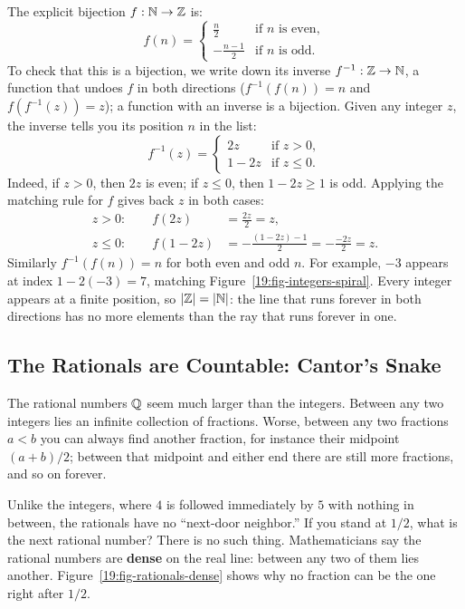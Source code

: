 The explicit bijection $f: \mathbb{N} \to \mathbb{Z}$ is:
\[
f(n) = \begin{cases} \frac{n}{2} & \text{if } n \text{ is even}, \\ -\frac{n-1}{2} & \text{if } n \text{ is odd}. \end{cases}
\]
To check that this is a bijection, we write down its inverse $f^{-1}: \mathbb{Z} \to \mathbb{N}$, a function that undoes $f$ in both directions ($f^{-1}(f(n)) = n$ and $f(f^{-1}(z)) = z$); a function with an inverse is a bijection. Given any integer $z$, the inverse tells you its position $n$ in the list:
\[
f^{-1}(z) = \begin{cases} 2z & \text{if } z > 0, \\ 1 - 2z & \text{if } z \le 0. \end{cases}
\]
Indeed, if $z > 0$, then $2z$ is even; if $z \le 0$, then $1 - 2z \ge 1$ is odd. Applying the matching rule for $f$ gives back $z$ in both cases:
\begin{align*}
z > 0: \qquad f(2z) &= \frac{2z}{2} = z, \\
z \le 0: \qquad f(1 - 2z) &= -\frac{(1 - 2z) - 1}{2} = -\frac{-2z}{2} = z.
\end{align*}
Similarly $f^{-1}(f(n)) = n$ for both even and odd $n$. For example, $-3$ appears at index $1 - 2(-3) = 7$, matching Figure~\ref{19:fig-integers-spiral}. Every integer appears at a finite position, so $|\mathbb{Z}| = |\mathbb{N}|$: the line that runs forever in both directions has no more elements than the ray that runs forever in one.

\subsection{The Rationals are Countable: Cantor's Snake}

The rational numbers $\mathbb{Q}$ seem much larger than the integers. Between any two integers lies an infinite collection of fractions. Worse, between any two fractions $a < b$ you can always find another fraction, for instance their midpoint $(a+b)/2$; between that midpoint and either end there are still more fractions, and so on forever. 

Unlike the integers, where $4$ is followed immediately by $5$ with nothing in between, the rationals have no ``next-door neighbor.'' If you stand at $1/2$, what is the next rational number? There is no such thing. Mathematicians say the rational numbers are \textbf{dense} on the real line: between any two of them lies another. Figure~\ref{19:fig-rationals-dense} shows why no fraction can be the one right after $1/2$.

